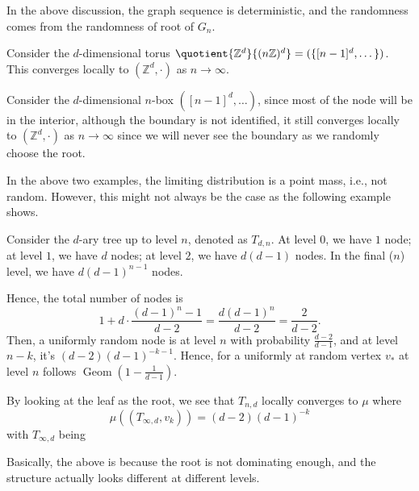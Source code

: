 \begin{note}
	In the above discussion, the graph sequence is deterministic, and the randomness comes from the randomness of root of \(G_n\).
\end{note}

\begin{eg}[Torus]
	Consider the \(d\)-dimensional torus \(\quotient{\mathbb{Z} ^d }{(n \mathbb{Z} )^d} = (\{ [n-1]^d, \dots \} )\). This converges locally to \((\mathbb{Z} ^d, \cdot)\) as \(n \to \infty \).
\end{eg}

\begin{eg}[Box]
	Consider the \(d\)-dimensional \(n\)-box \(([n-1]^d, \dots )\), since most of the node will be in the interior, although the boundary is not identified, it still converges locally to \((\mathbb{Z} ^d, \cdot)\) as \(n \to \infty \) since we will never see the boundary as we randomly choose the root.
\end{eg}

In the above two examples, the limiting distribution is a point mass, i.e., not random. However, this might not always be the case as the following example shows.

\begin{eg}[Tree]
	Consider the \(d\)-ary tree up to level \(n\), denoted as \(T_{d, n}\). At level \(0\), we have \(1\) node; at level \(1\), we have \(d\) nodes; at level \(2\), we have \(d (d-1)\) nodes. In the final (\(n\)) level, we have \(d(d-1)^{n-1}\) nodes.

	Hence, the total number of nodes is
	\[
		1 + d\cdot \frac{(d-1)^n - 1}{d-2}
		= \frac{d(d-1)^n}{d-2}
		= \frac{2}{d - 2}.
	\]
	Then, a uniformly random node is at level \(n\) with probability \(\frac{d-2}{d-1}\), and at level \(n-k\), it's \((d-2)(d-1)^{-k-1}\). Hence, for a uniformly at random vertex \(v_{\ast} \) at level \(n\) follows \(\operatorname{Geom}(1 - \frac{1}{d-1}) \).

	By looking at the leaf as the root, we see that \(T_{n, d}\) locally converges to \(\mu \) where
	\[
		\mu ((T_{\infty , d}, v_k))
		= (d-2)(d-1)^{-k}
	\]
	with \(T_{\infty , d}\) being


\end{eg}

\begin{intuition}
	Basically, the above is because the root is not dominating enough, and the structure actually looks different at different levels.
\end{intuition}

